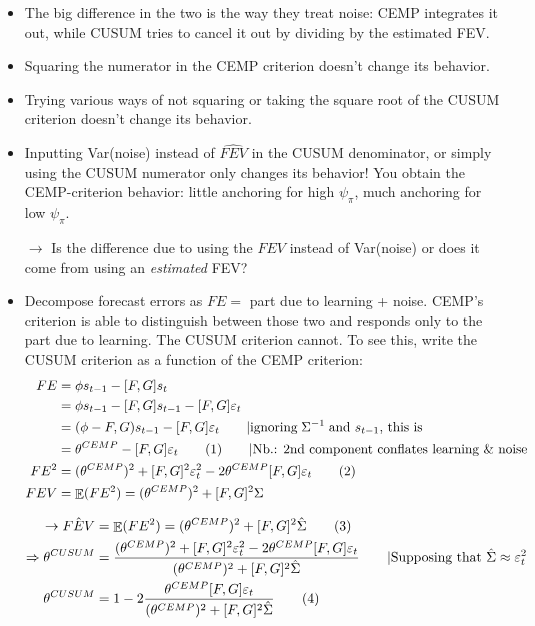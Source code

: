 \documentclass[11pt]{article}
\renewcommand{\[}{\begin{equation}}
\renewcommand{\]}{\end{equation}}
\DeclareMathOperator{\E}{\mathbb{E}}
\newcommand\numberthis{\addtocounter{equation}{1}\tag{\theequation}} %
\begin{document}
\begin{itemize}
\item The big difference in the two is the way they treat noise: CEMP integrates it out, while CUSUM tries to cancel it out by dividing by the estimated FEV.
\item Squaring the numerator in the CEMP criterion doesn't change its behavior. 
\item Trying various ways of not squaring or taking the square root of the CUSUM criterion doesn't change its behavior.
\item Inputting Var(noise) instead of $\hat{FEV}$ in the CUSUM denominator, or simply using the CUSUM numerator only changes its behavior! You obtain the CEMP-criterion behavior: little anchoring for high $\psi_{\pi}$, much anchoring for low $\psi_{\pi}$.
\item[$\rightarrow$] Is the difference due to using the $FEV$ instead of Var(noise) or does it come from using an \emph{estimated} FEV?
\item Decompose forecast errors as $FE = $ part due to learning + noise. CEMP's criterion is able to distinguish between those two and responds only to the part due to learning. The CUSUM criterion cannot. To see this, write the CUSUM criterion as a function of the CEMP criterion:
\begin{align*}
FE & = \phi s_{t-1}-[F,G]s_t  \\ 
&=  \phi s_{t-1}-[F,G]s_{t-1} -[F,G]\varepsilon_{t} \\
& = (\phi-{F,G})s_{t-1} -[F,G]\varepsilon_{t} \quad \quad | \text{ignoring} \; \Sigma^{-1} \; \text{and $s_{t-1}$, this is}\\
& = \theta^{CEMP} - [F,G]\varepsilon_{t}  \numberthis \quad \quad | \text{Nb.: 2nd component conflates learning \& noise} \\
FE^2 & = (\theta^{CEMP})^2 + [F,G]^2\varepsilon_{t}^2 -2 \theta^{CEMP} [F,G]\varepsilon_{t} \numberthis \\
FEV & = \E(FE^2) = (\theta^{CEMP})^2 + [F,G]^2\Sigma
\end{align*}

\begin{align*}
\rightarrow \hat{FEV} & = \E(FE^2) = (\theta^{CEMP})^2 + [F,G]^2\hat{\Sigma} \numberthis \\
\Rightarrow \theta^{CUSUM} & = \frac{(\theta^{CEMP})^2 + [F,G]^2\varepsilon_{t}^2 -2 \theta^{CEMP} [F,G]\varepsilon_{t}}{ (\theta^{CEMP})^2 + [F,G]^2\hat{\Sigma}} \quad \quad | \text{Supposing that $\hat{\Sigma}\approx \varepsilon_t^2$} \\
 \theta^{CUSUM} & = 1- 2\frac{ \theta^{CEMP} [F,G]\varepsilon_{t}}{(\theta^{CEMP})^2 + [F,G]^2\hat{\Sigma}}\numberthis \label{thetcusum}
\end{align*}
\end{itemize}
\end{document}
